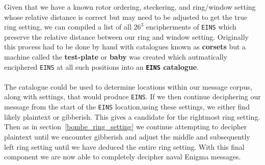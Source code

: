 \noindent Given that we have a known rotor ordering, steckering, and ring/window setting whose relative distance is correct but may need to be adjusted to get the true ring setting, we can compiled a list of all $26^3$ encipherments of \texttt{EINS} which preserve the relative distance between our ring and window setting. Originally this process had to be done by hand with catalogues known as {\bf{corsets}} but a machine called the {\bf{test-plate}} or {\bf{baby}} was created which autmatically enciphered \texttt{EINS} at all such positions into an {\bf{\texttt{EINS} catalogue}}.
\\\\The catalogue could be used to determine locations within our message corpus, along with settings, that would produce \texttt{EINS}. If we then continue deciphering our message from the start of the \texttt{EINS} location,using these settings, we either find likely plaintext or gibberish. This gives a candidate for the rightmost ring setting. Then as in section~\ref{bombe_ring_setting} we continue attempting to decipher plaintext until we encounter gibberish and adjust the middle and subsequently left ring setting until we have deduced the entire ring setting. With this final component we are now able to completely decipher naval Enigma messages.


